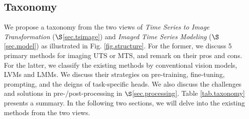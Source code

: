 \vspace{-0.1cm}

\subsection{Taxonomy}


We propose a taxonomy from %
the two views of {\em Time Series to Image Transformation} ($\S$\ref{sec.tsimage}) and {\em Imaged Time Series Modeling} ($\S$\ref{sec.model}) as illustrated in Fig. \ref{fig.structure}. For the former, %
we %
discuss 5 primary methods for %
imaging UTS or MTS, %
and remark on their pros and cons. For the latter, %
we classify the existing methods by conventional vision models, LVMs and LMMs. We discuss their strategies on pre-training, fine-tuning, prompting, and the deigns of task-specific heads. We also discuss the challenges and solutions in pre-/post-processing in $\S$\ref{sec.processing}. Table \ref{tab.taxonomy} presents a summary. In the following two sections, we will delve into the existing methods from the two views.


